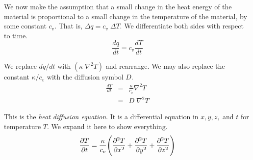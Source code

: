 \newpage
We now make the assumption that a small change in the heat energy of the material
is proportional to a small change in the temperature of the material, by some constant $c_v$.
That is, $\Delta q = c_v \; \Delta T$.
We differentiate both sides with respect to time.
\begin{equation}
  \frac{dq}{dt} = c_v \frac{dT}{dt}
\end{equation}

We replace $dq/dt$ with $(\kappa\;\nabla^2 T)$ and rearrange.
We may also replace the constant $\kappa / c_v$ with the diffusion symbol $D$.
\begin{eqnarray}
  \frac{dT}{dt} &=& \frac{\kappa}{c_v} \nabla^2 T \\
  &=& D \; \nabla^2 T
\end{eqnarray}

This is the \emph{heat diffusion equation}.
It is a differential equation in $x, y, z,$ and $t$ for temperature $T$.
We expand it here to show everything.
\begin{equation*}
  \frac{\partial T}{\partial t} = \frac{\kappa}{c_v}
  \Bigg( \frac{\partial ^2T}{\partial x^2} + \frac{\partial ^2T}{\partial y^2} + \frac{\partial ^2T}{\partial z^2} \Bigg)
\end{equation*}

